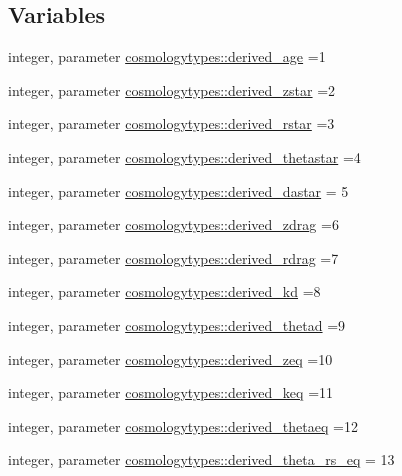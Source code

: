 \subsection*{Variables}
\begin{DoxyCompactItemize}
\item 
integer, parameter \mbox{\hyperlink{namespacecosmologytypes_ac41d8787a0c66b372de6431ec8d5d90e}{cosmologytypes\+::derived\+\_\+age}} =1
\item 
integer, parameter \mbox{\hyperlink{namespacecosmologytypes_ae9b4848c3438334ab15af3a9c5e38947}{cosmologytypes\+::derived\+\_\+zstar}} =2
\item 
integer, parameter \mbox{\hyperlink{namespacecosmologytypes_a273d7a236ebfc592e91d30f5f1d65691}{cosmologytypes\+::derived\+\_\+rstar}} =3
\item 
integer, parameter \mbox{\hyperlink{namespacecosmologytypes_a3828603ab7ab791295ab034337359f18}{cosmologytypes\+::derived\+\_\+thetastar}} =4
\item 
integer, parameter \mbox{\hyperlink{namespacecosmologytypes_ad7c434d95788f75aebc8ad1a2344ae22}{cosmologytypes\+::derived\+\_\+dastar}} = 5
\item 
integer, parameter \mbox{\hyperlink{namespacecosmologytypes_a2560d826bb11395cab2b36e611467be4}{cosmologytypes\+::derived\+\_\+zdrag}} =6
\item 
integer, parameter \mbox{\hyperlink{namespacecosmologytypes_abccb586a131096107b8e9d3b4e9ef8e3}{cosmologytypes\+::derived\+\_\+rdrag}} =7
\item 
integer, parameter \mbox{\hyperlink{namespacecosmologytypes_aced8968e4a5258b1eb562971c4d49d5c}{cosmologytypes\+::derived\+\_\+kd}} =8
\item 
integer, parameter \mbox{\hyperlink{namespacecosmologytypes_a5a52bc52cd7bc22fa7f0f61ce2f7a67c}{cosmologytypes\+::derived\+\_\+thetad}} =9
\item 
integer, parameter \mbox{\hyperlink{namespacecosmologytypes_ad60924495182c1a45a6d505bb18ad377}{cosmologytypes\+::derived\+\_\+zeq}} =10
\item 
integer, parameter \mbox{\hyperlink{namespacecosmologytypes_a4001ca23b9dc519f82acc58ca8c530b2}{cosmologytypes\+::derived\+\_\+keq}} =11
\item 
integer, parameter \mbox{\hyperlink{namespacecosmologytypes_a80034ea7e9b15ff769de8da4c5320653}{cosmologytypes\+::derived\+\_\+thetaeq}} =12
\item 
integer, parameter \mbox{\hyperlink{namespacecosmologytypes_a2475050c0f8bf96fdeea239d996693ba}{cosmologytypes\+::derived\+\_\+theta\+\_\+rs\+\_\+eq}} = 13

\end{DoxyCompactItemize}
